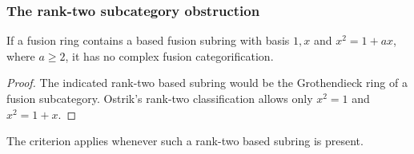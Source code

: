 \subsubsection{The rank-two subcategory obstruction}
\begin{proposition}\label{finite:prop:ranktwo}
If a fusion ring contains a based fusion subring with basis $1,x$ and $x^2=1+ax$, where $a\geq2$, it has no complex fusion categorification.
\end{proposition}
\begin{proof}
The indicated rank-two based subring would be the Grothendieck ring
of a fusion subcategory. Ostrik's rank-two classification
\cite[Theorem~1]{OstrikRankTwo} allows only $x^2=1$ and $x^2=1+x$.
\end{proof}
The criterion applies whenever such a rank-two based subring is present.

